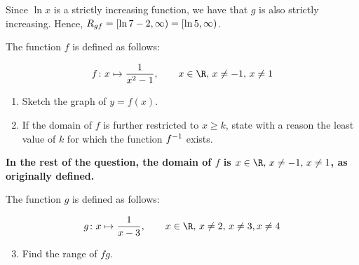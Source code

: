 \documentclass{echw}
\begin{document}
            Since $\ln x$ is a strictly increasing function, we have that $g$ is also strictly increasing. Hence, $R_{gf} = [\ln{7 - 2}, \infty) = [\ln 5, \infty)$.
            
            \boxt{$\ran{gf} = [\ln 5, \infty)$}

    \problem{}
        The function $f$ is defined as follows:

        \[
            f \colon x \mapsto \dfrac1{x^2 - 1}, \qquad x \in \R, \, x \neq -1, \, x \neq 1
        \]

        \begin{enumerate}
            \item Sketch the graph of $y = f(x)$.
            \item If the domain of $f$ is further restricted to $x \geq k$, state with a reason the least value of $k$ for which the function $f^{-1}$ exists.
        \end{enumerate}

         \textbf{In the rest of the question, the domain of $f$ is $x \in \R, \, x \neq -1, \, x \neq 1$, as originally defined.}

        \smallskip

         The function $g$ is defined as follows:

        \[
            g \colon x \mapsto \dfrac1{x-3}, \qquad x \in \R, \, x \neq 2, \, x \neq 3, x \neq 4
        \]

        \begin{enumerate}
            \setcounter{enumi}{2}
            \item Find the range of $fg$.
        \end{enumerate}
    
    \solution
\end{document}
